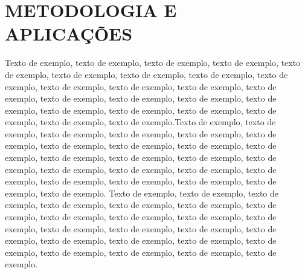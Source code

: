 \chapter{METODOLOGIA E APLICAÇÕES}\label{cap4}

Texto de exemplo, texto de exemplo, texto de exemplo, texto de exemplo, texto de exemplo, texto de exemplo, texto de exemplo, texto de exemplo, texto de exemplo, texto de exemplo, texto de exemplo, texto de exemplo, texto de exemplo, texto de exemplo, texto de exemplo, texto de exemplo, texto de exemplo, texto de exemplo, texto de exemplo, texto de exemplo, texto de exemplo, texto de exemplo, texto de exemplo.Texto de exemplo, texto de exemplo, texto de exemplo, texto de exemplo, texto de exemplo, texto de exemplo, texto de exemplo, texto de exemplo, texto de exemplo, texto de exemplo, texto de exemplo, texto de exemplo, texto de exemplo, texto de exemplo, texto de exemplo, texto de exemplo, texto de exemplo, texto de exemplo, texto de exemplo, texto de exemplo, texto de exemplo, texto de exemplo, texto de exemplo. Texto de exemplo, texto de exemplo, texto de exemplo, texto de exemplo, texto de exemplo, texto de exemplo, texto de exemplo, texto de exemplo, texto de exemplo, texto de exemplo, texto de exemplo, texto de exemplo, texto de exemplo, texto de exemplo, texto de exemplo, texto de exemplo, texto de exemplo, texto de exemplo, texto de exemplo, texto de exemplo, texto de exemplo, texto de exemplo, texto de exemplo.




